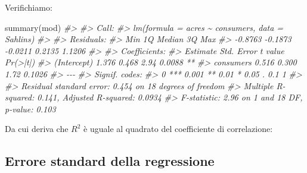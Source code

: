\documentclass[
  11pt,
]{krantz}
\makeatletter
\newenvironment{Shaded}{\begin{snugshade}}{\end{snugshade}}
\newcommand{\CommentTok}[1]{\textcolor[rgb]{0.37,0.37,0.37}{\textit{#1}}}
\newcommand{\DecValTok}[1]{\textcolor[rgb]{0.06,0.06,0.06}{#1}}
\newcommand{\FunctionTok}[1]{\textcolor[rgb]{0,0,0}{#1}}
\newcommand{\NormalTok}[1]{#1}
\newcommand{\SpecialCharTok}[1]{\textcolor[rgb]{0,0,0}{#1}}
\newenvironment{kframe}{%
\medskip{}
\setlength{\fboxsep}{.8em}
 \def\at@end@of@kframe{}%
 \ifinner\ifhmode%
  \def\at@end@of@kframe{\end{minipage}}%
  \begin{minipage}{\columnwidth}%
 \fi\fi%
 \def\FrameCommand##1{\hskip\@totalleftmargin \hskip-\fboxsep
 \colorbox{shadecolor}{##1}\hskip-\fboxsep
     \hskip-\linewidth \hskip-\@totalleftmargin \hskip\columnwidth}%
 \MakeFramed {\advance\hsize-\width
   \@totalleftmargin\z@ \linewidth\hsize
   \@setminipage}}%
 {\par\unskip\endMakeFramed%
 \at@end@of@kframe}
\renewenvironment{Shaded}{\begin{kframe}}{\end{kframe}}
\makeatother
\begin{document}
Verifichiamo:

\begin{Shaded}
\begin{Highlighting}[]
\FunctionTok{summary}\NormalTok{(mod)}
\CommentTok{\#\textgreater{} }
\CommentTok{\#\textgreater{} Call:}
\CommentTok{\#\textgreater{} lm(formula = acres \textasciitilde{} consumers, data = Sahlins)}
\CommentTok{\#\textgreater{} }
\CommentTok{\#\textgreater{} Residuals:}
\CommentTok{\#\textgreater{}     Min      1Q  Median      3Q     Max }
\CommentTok{\#\textgreater{} {-}0.8763 {-}0.1873 {-}0.0211  0.2135  1.1206 }
\CommentTok{\#\textgreater{} }
\CommentTok{\#\textgreater{} Coefficients:}
\CommentTok{\#\textgreater{}             Estimate Std. Error t value Pr(\textgreater{}|t|)   }
\CommentTok{\#\textgreater{} (Intercept)    1.376      0.468    2.94   0.0088 **}
\CommentTok{\#\textgreater{} consumers      0.516      0.300    1.72   0.1026   }
\CommentTok{\#\textgreater{} {-}{-}{-}}
\CommentTok{\#\textgreater{} Signif. codes:  }
\CommentTok{\#\textgreater{} 0 \textquotesingle{}***\textquotesingle{} 0.001 \textquotesingle{}**\textquotesingle{} 0.01 \textquotesingle{}*\textquotesingle{} 0.05 \textquotesingle{}.\textquotesingle{} 0.1 \textquotesingle{} \textquotesingle{} 1}
\CommentTok{\#\textgreater{} }
\CommentTok{\#\textgreater{} Residual standard error: 0.454 on 18 degrees of freedom}
\CommentTok{\#\textgreater{} Multiple R{-}squared:  0.141,  Adjusted R{-}squared:  0.0934 }
\CommentTok{\#\textgreater{} F{-}statistic: 2.96 on 1 and 18 DF,  p{-}value: 0.103}
\end{Highlighting}
\end{Shaded}

Da cui deriva che \(R^2\) è uguale al quadrato del coefficiente di correlazione:

\begin{Shaded}
\end{Shaded}

\hypertarget{errore-standard-della-regressione}{%
\subsection{Errore standard della regressione}\label{errore-standard-della-regressione}}
\end{document}
